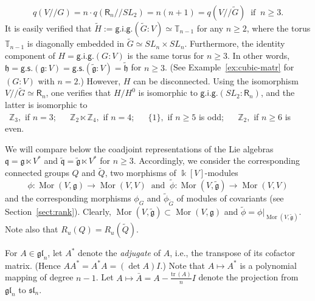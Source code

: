 \begin{ex}
\[
    q(V{/\!\!/} G)=n{\cdot}q({\mathsf{R}} _n{/\!\!/} SL_2)= n(n+1)=q(V{/\!\!/} \tilde G) \ \text{ if } \ n{\geqslant} 3 . 
\]
It is easily verified that $\tilde H:={\mathsf{g.i.g.}}(\tilde G:V)\simeq {{\mathbb T}}_{n-1}$ for any $n{\geqslant} 2$, where the torus 
${{\mathbb T}}_{n-1}$ is diagonally embedded in $\tilde G\simeq SL_n\times SL_n$. Furthermore, the identity 
component of $H={\mathsf{g.i.g.}}(G:V)$ is the same torus for $n{\geqslant} 3$. In other words, 
${{\mathfrak h}}=\mathsf{g.s.}({{\mathfrak g}}{:}V)=\mathsf{g.s.}(\tilde{{\mathfrak g}}{:}V)=\tilde {{\mathfrak h}}$ for $n{\geqslant} 3$. (See Example~\ref{ex:cubic-matr} for $(G:V)$ with $n=2$.)
However, $H$ can be disconnected. Using the isomorphism $V{/\!\!/} \tilde G\simeq {\mathsf{R}}_n$, one verifies that $H/H^0$ is isomorphic to ${\mathsf{g.i.g.}}(SL_2:{\mathsf{R}}_n)$, and the latter is isomorphic to 
\\ \indent
{\color{MIXT}\textbullet} \  ${{\mathbb Z}}_3,$ if $n=3$; \ {\color{MIXT}\textbullet} \  ${{\mathbb Z}}_2\ltimes{{\mathbb Z}}_4,$ if $n=4$; 
\ {\color{MIXT}\textbullet} \  $\{1\},$ if $n{\geqslant} 5$ is odd; \ {\color{MIXT}\textbullet} \  ${{\mathbb Z}}_2,$ if $n{\geqslant} 6$ is even.

We will compare below the coadjoint representations of the Lie algebras ${{\mathfrak q}}={{\mathfrak g}}\ltimes V^*$ and 
$\tilde{{\mathfrak q}}=\tilde{{\mathfrak g}}\ltimes V^*$ for $n{\geqslant} 3$.
Accordingly, we consider the corresponding connected groups $Q$ and $\tilde Q$,  
two morphisms of ${\Bbbk}[V]$-modules
\[
    \phi:  {\operatorname{Mor}}(V,{{\mathfrak g}}) \to {\operatorname{Mor}}(V,V) \ \text{ and } \ \tilde\phi:  {\operatorname{Mor}}(V,\tilde{{\mathfrak g}}) \to {\operatorname{Mor}}(V,V) 
\]
and the corresponding morphisms $\phi_G$ and $\tilde\phi_{\tilde G}$ of modules of covariants (see 
Section~\ref{sect:rank}). Clearly, ${\operatorname{Mor}}(V,\tilde{{\mathfrak g}})\subset {\operatorname{Mor}}(V,{{\mathfrak g}})$ and 
$\tilde\phi=\phi\vert_{{\operatorname{Mor}}(V,\tilde{{\mathfrak g}})}$. Note also that $R_u(Q)=R_u(\tilde Q)$.

For $A\in{{\mathfrak{gl}}_n}$, let $A^*$ denote the {\it adjugate\/} of $A$, i.e., the transpose of its cofactor matrix. (Hence 
$AA^*=A^*A=(\det A)I$.)  Note that $A\mapsto A^*$ is a polynomial mapping of degree
$n-1$.  Let $A\mapsto \bar A=A-\frac{{{\mathrm{tr\,}}}(A)}{n}I$ denote the projection from ${{\mathfrak{gl}}_n}$ to ${{\mathfrak{sl}}_n}$. 


\end{ex}
